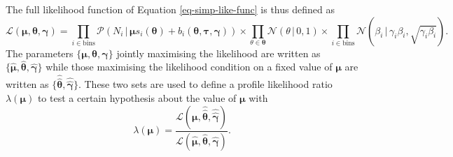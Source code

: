 The full likelihood function of Equation \ref{eq-simp-like-func} is thus defined as
\begin{equation}
\mathcal{L}\left(\boldsymbol{\mu}, \boldsymbol{\theta}, \boldsymbol{\gamma}\right) = \prod_{i\in \textrm{bins}} \mathcal{P}(N_i \,|\, \boldsymbol{\mu} s_i(\boldsymbol{\theta}) + b_i(\boldsymbol{\theta}, \boldsymbol{\tau}, \boldsymbol{\gamma})) \times  \prod_{\theta \in \boldsymbol{\theta}} \mathcal{N}(\theta \,|\, 0, 1) \times \prod_{i \in \textrm{bins}} \mathcal{N}(\beta_i \,|\, \gamma_i \beta_i, \sqrt{\gamma_i \beta_i}).
\end{equation}
The parameters $\{\boldsymbol{\mu}, \boldsymbol{\theta}, \boldsymbol{\gamma}\}$ jointly maximising the likelihood are written as $\{\hat{\boldsymbol{\mu}}, \hat{\boldsymbol{\theta}}, \hat{\boldsymbol{\gamma}}\}$ while those maximising the likelihood condition on a fixed value of $\boldsymbol{\mu}$ are written as $\{\hat{\hat{\boldsymbol{\theta}}}, \hat{\hat{\boldsymbol{\gamma}}}\}$. These two sets are used to define a profile likelihood ratio $\lambda(\boldsymbol{\mu})$ to test a certain hypothesis about the value of $\boldsymbol{\mu}$ with
\begin{equation}\label{eq-lik-ratio}
    \lambda(\boldsymbol{\mu}) = \frac{\mathcal{L}\left(\boldsymbol{\mu}, \hat{\hat{\boldsymbol{\theta}}}, \hat{\hat{\boldsymbol{\gamma}}} \right)}{\mathcal{L}\left(\hat{\boldsymbol{\mu}}, \hat{\boldsymbol{\theta}}, \hat{\boldsymbol{\gamma}} \right)}.
\end{equation}

